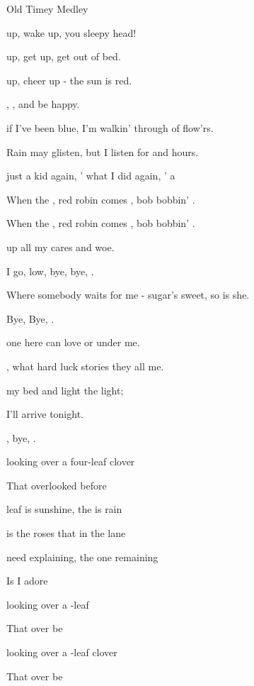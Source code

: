 \begin{SBSong}{Old Timey Medley}
\begin{SBVerse}
	 up, wake up, you sleepy head!
	
	 up, get up, get out of bed.
	
	 up, cheer up - the sun is red.
	
	,  ,   and be happy.
	
	\CBPageBrk
	
	 if I've been blue,  I'm walkin' through  of flow'rs.
	
	Rain may glisten, but  I listen for  and hours.
	
	 just a kid again, ' what I did again, ' a 
	
	When the , red robin comes , bob bobbin' .
	
	When the , red robin comes , bob bobbin' .
  \end{SBVerse}
  \begin{SBVerse}
     up all my cares and woe.
    
     I go,  low, bye, bye, .
    
    Where somebody waits for me - sugar's sweet, so is she.
    
    Bye, Bye, .
    
     one here can love or under me.
    
    , what hard luck stories they all  me.
    
     my bed and light the light;
    
    I'll arrive  tonight.
    
    , bye, .
  \end{SBVerse}
  \begin{SBVerse}
     looking over a four-leaf clover

    That  overlooked before

     leaf is sunshine, the  is rain

     is the roses that  in the lane

     need explaining, the one remaining

    Is  I adore

     looking over a -leaf 

    That  over be

     looking over a -leaf 
{clover}
    
    That  over be
  \end{SBVerse}
\end{SBSong}
